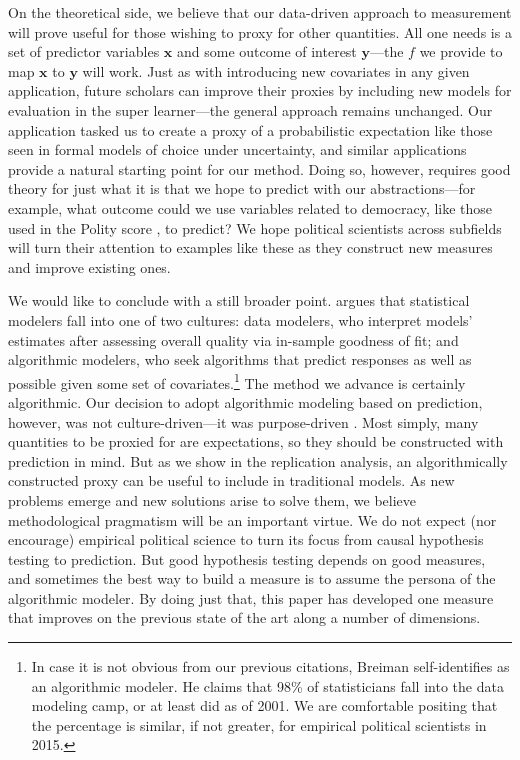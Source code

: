 On the theoretical side, we believe that our data-driven approach to measurement will prove useful for those wishing to proxy for other quantities.
All one needs is a set of predictor variables $\boldsymbol{x}$ and some outcome of interest $\boldsymbol{y}$---the $f$ we provide to map $\boldsymbol{x}$ to $\boldsymbol{y}$ will work.
Just as with introducing new covariates in any given application, future scholars can improve their proxies by including new models for evaluation in the super learner---the general approach remains unchanged.
Our application tasked us to create a proxy of a probabilistic expectation like those seen in formal models of choice under uncertainty, and similar applications provide a natural starting point for our method.
Doing so, however, requires good theory for just what it is that we hope to predict with our abstractions---for example, what outcome could we use variables related to democracy, like those used in the Polity score \citep{marshall2014}, to predict?
We hope political scientists across subfields will turn their attention to examples like these as they construct new measures and improve existing ones.

We would like to conclude with a still broader point.
\citet{Breiman:2001fd} argues that statistical modelers fall into one of two cultures: data modelers, who interpret models' estimates after assessing overall quality via in-sample goodness of fit; and algorithmic modelers, who seek algorithms that predict responses as well as possible given some set of covariates.\footnote{%
  In case it is not obvious from our previous citations, Breiman self-identifies as an algorithmic modeler.
  He claims that 98\% of statisticians fall into the data modeling camp, or at least did as of 2001.
  We are comfortable positing that the percentage is similar, if not greater, for empirical political scientists in 2015.
}
The method we advance is certainly algorithmic.
Our decision to adopt algorithmic modeling based on prediction, however, was not culture-driven---it was purpose-driven \citep{clarke2012}.
Most simply, many quantities to be proxied for are expectations, so they should be constructed with prediction in mind.
But as we show in the replication analysis, an algorithmically constructed proxy can be useful to include in traditional models.
As new problems emerge and new solutions arise to solve them, we believe methodological pragmatism will be an important virtue.
We do not expect (nor encourage) empirical political science to turn its focus from causal hypothesis testing to prediction.
But good hypothesis testing depends on good measures, and sometimes the best way to build a measure is to assume the persona of the algorithmic modeler.
By doing just that, this paper has developed one measure that improves on the previous state of the art along a number of dimensions.

